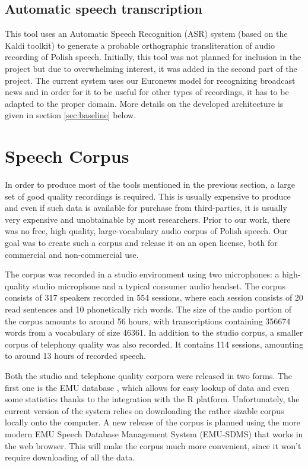 \documentclass[a4paper,11pt]{article}
\begin{document}
\subsection{Automatic speech transcription}

This tool uses an Automatic Speech Recognition (ASR) system (based on the Kaldi toolkit) to generate a probable orthographic transliteration of audio recording of Polish speech. Initially, this tool was not planned for inclusion in the project but due to overwhelming interest, it was added in the second part of the project. The current system uses our Euronews model for recognizing broadcast news \cite{marasek2014spoken} and in order for it to be useful for other types of recordings, it has to be adapted to the proper domain. More details on the developed architecture is given in section \ref{sec:baseline} below.

\section{Speech Corpus}

In order to produce most of the tools mentioned in the previous section, a large set of good quality recordings is required. This is usually expensive to produce and even if such data is available for purchase from third-parties, it is usually very expensive and unobtainable by most researchers. Prior to our work, there was no free, high quality, large-vocabulary audio corpus of Polish speech. Our goal was to create such a corpus and release it on an open license, both for commercial and non-commercial use.

The corpus was recorded in a studio environment using two microphones: a high-quality studio microphone and a typical consumer audio headset. The corpus consists of 317 speakers recorded in 554 sessions, where each session consists of 20 read sentences and 10 phonetically rich words. The size of the audio portion of the corpus amounts to around 56 hours, with transcriptions containing 356674 words from a vocabulary of size 46361. In addition to the studio corpus, a smaller corpus of telephony quality was also recorded. It contains 114 sessions, amounting to around 13 hours of recorded speech.

Both the studio and telephone quality corpora were released in two forms. The first one is the EMU database \cite{cassidy2001multi}, which allows for easy lookup of data and even some statistics thanks to the integration with the R platform. Unfortunately, the current version of the system relies on downloading the rather sizable corpus locally onto the computer. A new release of the corpus is planned using the more modern EMU Speech Database Management System (EMU-SDMS) that works in the web browser. This will make the corpus much more convenient, since it won't require downloading of all the data. 
\end{document}
